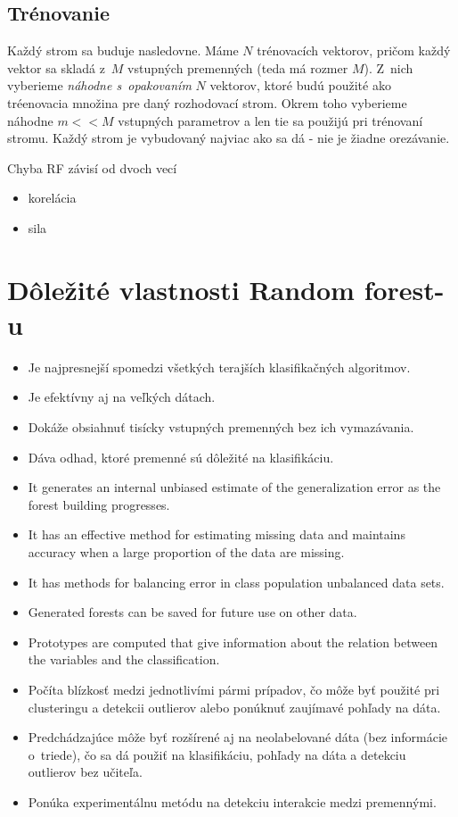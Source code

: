 \subsection{Trénovanie}
Každý strom sa buduje nasledovne.
Máme $N$ trénovacích vektorov, pričom každý vektor sa skladá z~$M$ vstupných premenných (teda má rozmer $M$).
Z~nich vyberieme \textit{náhodne s~opakovaním} $N$ vektorov, ktoré budú použité ako tréenovacia množina pre daný rozhodovací strom.
Okrem toho vyberieme náhodne $m<<M$ vstupných parametrov a len tie sa použijú pri trénovaní stromu. Každý strom je vybudovaný najviac ako sa dá - nie je žiadne orezávanie.

Chyba RF závisí od dvoch vecí
\begin{itemize}
\item korelácia
\item sila
\end{itemize}


\section[Dôležité vlastnosti]{Dôležité vlastnosti Random forest-u}
\begin{itemize}
\item Je najpresnejší spomedzi všetkých terajších klasifikačných algoritmov.
\item Je efektívny aj na veľkých dátach.
\item Dokáže obsiahnuť tisícky vstupných premenných bez ich vymazávania.
\item Dáva odhad, ktoré premenné sú dôležité na klasifikáciu.
\item It generates an internal unbiased estimate of the generalization error as the forest building progresses.
\item It has an effective method for estimating missing data and maintains accuracy when a large proportion of the data are missing.
\item It has methods for balancing error in class population unbalanced data sets.
\item Generated forests can be saved for future use on other data.
\item Prototypes are computed that give information about the relation between the variables and the classification.
\item Počíta blízkosť medzi jednotlivími pármi prípadov, čo môže byť použité pri clusteringu a detekcii outlierov alebo ponúknuť zaujímavé pohľady na dáta.
\item Predchádzajúce môže byť rozšírené aj na neolabelované dáta (bez informácie o~triede), čo sa dá použiť na klasifikáciu, pohľady na dáta a detekciu outlierov bez učiteľa.
\item Ponúka experimentálnu metódu na detekciu interakcie medzi premennými.
\end{itemize}



